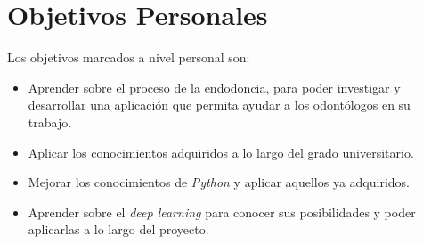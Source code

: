 \section{Objetivos Personales}
Los objetivos marcados a nivel personal son:
\begin{itemize}
    \item Aprender sobre el proceso de la endodoncia, para poder investigar y desarrollar una aplicación que permita ayudar a los odontólogos en su trabajo.
    \item Aplicar los conocimientos adquiridos a lo largo del grado universitario.
    \item Mejorar los conocimientos de \emph{Python} y aplicar aquellos ya adquiridos.
    \item Aprender sobre el \emph{deep learning} para conocer sus posibilidades y poder aplicarlas a lo largo del proyecto.
\end{itemize}